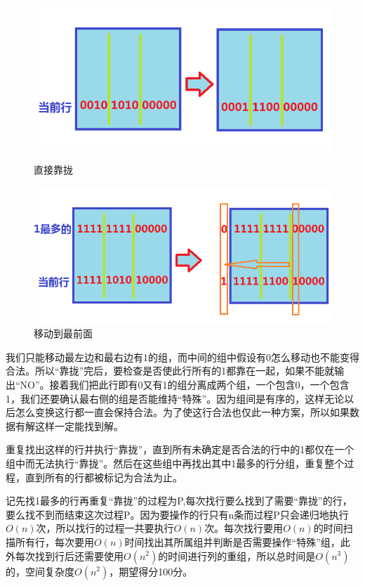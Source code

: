 \documentclass[UTF8]{ctexart}
\begin{document}
		\vfill
		\newpage
		\begin{figure}
			\centering
			\begin{minipage}{.45\textwidth}
				\centering
				\includegraphics[width=\textwidth]{fig1.png}
				\caption{直接靠拢}
			\end{minipage}
			\begin{minipage}{.45\textwidth}
				\centering
				\includegraphics[width=\textwidth]{fig2.png}
				\caption{移动到最前面}
			\end{minipage}
		\end{figure}
		
		我们只能移动最左边和最右边有1的组，而中间的组中假设有0怎么移动也不能变得合法。所以“靠拢”完后，要检查是否使此行所有的1都靠在一起，如果不能就输出“NO”。接着我们把此行即有0又有1的组分离成两个组，一个包含0，一个包含1，我们还要确认最右侧的组是否能维持“特殊”。因为组间是有序的，这样无论以后怎么变换这行都一直会保持合法。为了使这行合法也仅此一种方案，所以如果数据有解这样一定能找到解。
		
		重复找出这样的行并执行“靠拢”，直到所有未确定是否合法的行中的1都仅在一个组中而无法执行“靠拢”。然后在这些组中再找出其中1最多的行分组，重复整个过程，直到所有的行都被标记为合法为止。
		
		记先找1最多的行再重复“靠拢”的过程为P,每次找行要么找到了需要“靠拢”的行，要么找不到而结束这次过程P。因为要操作的行只有n条而过程P只会递归地执行$O(n)$次，所以找行的过程一共要执行$O(n)$次。每次找行要用$O(n)$的时间扫描所有行，每次要用$O(n)$时间找出其所属组并判断是否需要操作“特殊”组，此外每次找到行后还需要使用$O(n^2)$的时间进行列的重组，所以总时间是$O(n^3)$的，空间复杂度$O(n^2)$，期望得分100分。
		
\end{document}
